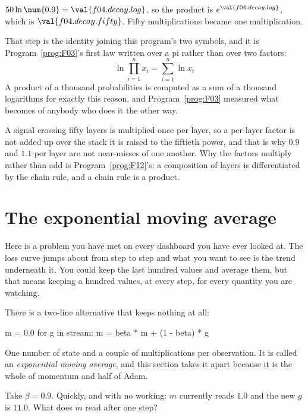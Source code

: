 \begin{fr}
\begin{ansblock}
$50 \ln \num{0.9} = \val{f04.decay.log}$, so the product is
$e^{\val{f04.decay.log}}$, which is $\val{f04.decay.fifty}$. Fifty
multiplications became one multiplication.
\end{ansblock}

That step is the identity joining this program's two symbols, and it is
Program~\ref{prog:F03}'s first law written over a pi rather than over two
factors:
\[ \ln \prod_{i=1}^{n} x_i = \sum_{i=1}^{n} \ln x_i \]
A product of a thousand probabilities is computed as a sum of a thousand
logarithms for exactly this reason, and Program~\ref{prog:F03} measured what
becomes of anybody who does it the other way.

A signal crossing fifty layers is multiplied once per layer, so a per-layer
factor is not added up over the stack \dash{} it is raised to the fiftieth
power, and that is why $\num{0.9}$ and $\num{1.1}$ per layer are not
near-misses of one another. Why the factors multiply rather than add is
Program~\ref{prog:F12}'s: a composition of layers is differentiated by the
chain rule, and a chain rule is a product.
\end{fr}

\section{The exponential moving average}
\label{sec:F04-ema}

\begin{fr}
Here is a problem you have met on every dashboard you have ever looked at. The
loss curve jumps about from step to step and what you want to see is the trend
underneath it. You could keep the last hundred values and average them, but
that means keeping a hundred values, at every step, for every quantity you are
watching.

There is a two-line alternative that keeps nothing at all:

\begin{python}
m = 0.0
for g in stream:
    m = beta * m + (1 - beta) * g
\end{python}

One number of state and a couple of multiplications per observation. It is
called an
\emph{exponential moving average}, and this section takes it apart because it
is the whole of momentum and half of Adam.

Take $\beta = \num{0.9}$. Quickly, and with no working: $m$ currently reads
$\num{1.0}$ and the new $g$ is $\num{11.0}$. What does $m$ read after one
step?
\dotline
\nextframe
\end{fr}

